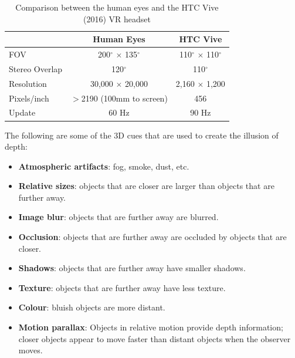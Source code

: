 \documentclass[11pt,a4paper]{article}
\theoremstyle{definition}
\theoremstyle{plain}
\theoremstyle{remark}
\begin{document}
    \begin{table}[H]
    \centering
    \begin{tabular}{|l|c|c|}
    \hline
     & \textbf{Human Eyes} & \textbf{HTC Vive} \\
    \hline
    FOV & 200$^\circ$ $\times$ 135$^\circ$ & 110$^\circ$ $\times$ 110$^\circ$ \\
    \hline
    Stereo Overlap & 120$^\circ$ & 110$^\circ$ \\
    \hline
    Resolution & 30,000 $\times$ 20,000 & 2,160 $\times$ 1,200 \\
    \hline
    Pixels/inch & $>$2190 (100mm to screen) & 456 \\
    \hline
    Update & 60 Hz & 90 Hz \\
    \hline
    \end{tabular}
    \caption{Comparison between the human eyes and the HTC Vive (2016) VR headset}
\end{table}
    

The following are some of the 3D cues that are used to create the illusion of depth:
\begin{itemize}
    \item \textbf{Atmospheric artifacts}: fog, smoke, dust, etc.
    \item \textbf{Relative sizes}: objects that are closer are larger than objects that are further away.
    \item \textbf{Image blur}: objects that are further away are blurred.
    \item \textbf{Occlusion}: objects that are further away are occluded by objects that are closer.
    \item \textbf{Shadows}: objects that are further away have smaller shadows.
    \item \textbf{Texture}: objects that are further away have less texture.
    \item \textbf{Colour}: bluish objects are more distant.
    \item \textbf{Motion parallax}: Objects in relative motion provide depth information; closer objects appear to move faster than distant objects when the observer moves.
\end{itemize}
\end{document}
